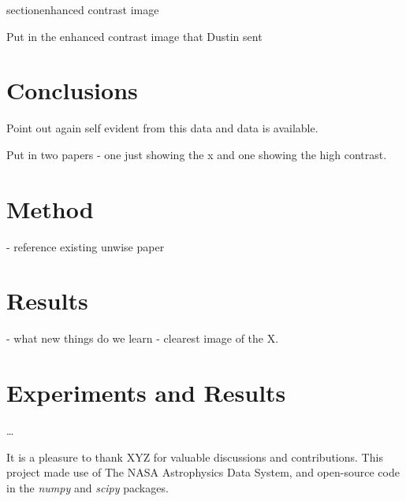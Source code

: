 \documentclass[12pt, preprint]{aastex}
\newcommand{\project}[1]{\textsl{#1}}
\begin{document}
section{enhanced contrast image} 

Put in the enhanced contrast image that Dustin sent 

\section {Conclusions} 

Point out again self evident from this data and data is available. 

Put in two papers - one just showing the x and one showing the high contrast. 


\section{Method}
- reference existing unwise paper 

\section{Results}  
- what new things do we learn 
- clearest image of the X. 

\section{Experiments and Results}

\ldots 

\acknowledgments
It is a pleasure to thank
XYZ
for valuable discussions and contributions.
This project made use of
  The NASA Astrophysics Data System,
  and open-source code in the \project{numpy} and \project{scipy} packages.
\end{document}
